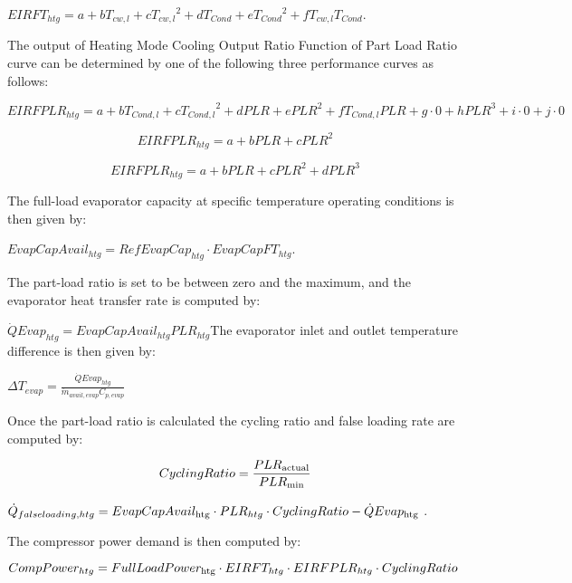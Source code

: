 \textbf{\emph{\(EIRF{T_{htg}} = a + b{T_{cw,l}} + c{T_{cw,l}}^2 + d{T_{Cond}} + e{T_{Cond}}^2 + f{T_{cw,l}}{T_{Cond}}\)}}.

The output of Heating Mode Cooling Output Ratio Function of Part Load Ratio curve can be determined by one of the following three performance curves as follows:

\begin{equation}
EIRFPL{R_{htg}} = a + b{T_{Cond,l}} + c{T_{Cond,l}}^2 + dPLR + ePL{R^2} + f{T_{Cond,l}}PLR + g \cdot 0 + hPL{R^3} + i \cdot 0 + j \cdot 0
\end{equation}

\begin{equation}
EIRFPL{R_{htg}} = a + bPLR + cPL{R^2}
\end{equation}

\begin{equation}
EIRFPL{R_{htg}} = a + bPLR + cPL{R^2} + dPL{R^3}
\end{equation}

The full-load evaporator capacity at specific temperature operating conditions is then given by:

\textbf{\emph{\(EvapCapAvai{l_{htg}} = RefEvapCa{p_{htg}} \cdot EvapCapF{T_{htg}}\)}}.

The part-load ratio is set to be between zero and the maximum, and the evaporator heat transfer rate is computed by:

\textbf{\emph{\(\dot QEva{p_{htg}} = EvapCapAvai{l_{htg}}PL{R_{htg}}\)}}The evaporator inlet and outlet temperature difference is then given by:

\textbf{\emph{\(\Delta {T_{evap}} = \frac{{\dot QEva{p_{htg}}}}{{{{\dot m}_{avail,evap}}{C_{p,evap}}}}\)}}

Once the part-load ratio is calculated the cycling ratio and false loading rate are computed by:

\begin{equation}
CyclingRatio = \frac{{PL{R_{{\rm{actual}}}}}}{{PL{R_{{\rm{min}}}}}}
\end{equation}

\({\dot Q_{falseloading,htg}} = EvapCapAvai{l_{{\rm{htg}}}} \cdot PL{R_{htg}} \cdot CyclingRatio - \dot QEva{p_{{\rm{htg}}}}\) .

The compressor power demand is then computed by:

\textbf{\emph{\(CompPowe{r_{htg}} = FullLoadPowe{r_{{\rm{htg}}}} \cdot {\rm{ }}EIRF{T_{htg}}{\rm{ }} \cdot EIRFPL{R_{htg}} \cdot CyclingRatio\)}}

